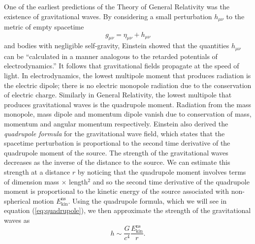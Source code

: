 One of the earliest predictions of the Theory of General Relativity was the
existence of gravitational waves. By considering a small perturbation
$h_{\mu\nu}$ to the metric of empty spacetime
\begin{equation}
g_{\mu\nu} = \eta_{\mu\nu} + h_{\mu\nu}
\end{equation}
and bodies with negligible self-gravity, Einstein showed that the quantities
$h_{\mu\nu}$ can be ``calculated in a manner analogous to the retarded
potentials of electrodynamics\cite{Einstein:1916}.''  
It follows that
gravitational fields propagate at the speed of light.  In electrodynamics, the
lowest multipole moment that produces radiation is the electric dipole; there
is no electric monopole radiation due to the conservation of electric charge.
Similarly in General Relativity, the lowest multipole that produces
gravitational waves is the quadrupole moment. Radiation from the 
mass monopole, mass dipole and momentum dipole vanish due to conservation of
mass, momentum and angular momentum respectively. Einstein also derived the
\emph{quadrupole formula} for the gravitational wave field, which states that
the spacetime perturbation is proportional to the second time derivative of
the quadrupole moment of the source.  The strength of the gravitational waves
decreases as the inverse of the distance to the source.  We can estimate
this strength at a distance $r$ by noticing that the quadrupole moment
involves terms of dimension mass $\times$ length$^2$ and so the second time
derivative of the quadrupole moment is proportional to the kinetic energy of the source
associated with non-spherical motion $E^\mathrm{ns}_\mathrm{kin}$. Using the
quadrupole formula, which we will see in equation (\ref{eq:quadrupole}), we
then approximate the strength of the gravitational waves as
\begin{equation}
h \sim \frac{G}{c^4}\frac{E^\mathrm{ns}_\mathrm{kin}}{r}.
\label{eq:strainest}
\end{equation}

